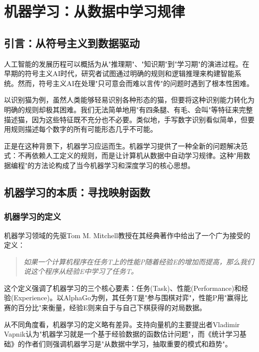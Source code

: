 \chapter{机器学习：从数据中学习规律}

\section{引言：从符号主义到数据驱动}

人工智能的发展历程可以概括为从"推理期"、"知识期"到"学习期"的演进过程。在早期的符号主义AI时代，研究者试图通过明确的规则和逻辑推理来构建智能系统。然而，符号主义AI在处理"只可意会而难以言传"的问题时遇到了根本性困难。

以识别猫为例，虽然人类能够轻易识别各种形态的猫，但要将这种识别能力转化为明确的规则却极其困难。我们无法简单地用"有四条腿、有毛、会叫"等特征来完整描述猫，因为这些特征既不充分也不必要。类似地，手写数字识别看似简单，但要用规则描述每个数字的所有可能形态几乎不可能。

正是在这种背景下，机器学习应运而生。机器学习提供了一种全新的问题解决范式：不再依赖人工定义的规则，而是让计算机从数据中自动学习规律。这种"用数据编程"的方法论构成了当今机器学习和深度学习的核心思想。

\section{机器学习的本质：寻找映射函数}

\subsection{机器学习的定义}

机器学习领域的先驱Tom M. Mitchell教授在其经典著作中给出了一个广为接受的定义：

\begin{quote}
\textit{如果一个计算机程序在任务T上的性能P随着经验E的增加而提高，那么我们说这个程序从经验E中学习了任务T。}
\end{quote}

这个定义强调了机器学习的三个核心要素：任务(Task)、性能(Performance)和经验(Experience)。以AlphaGo为例，其任务T是"参与围棋对弈"，性能P用"赢得比赛的百分比"来衡量，经验E则来自于与自己下棋获得的对局数据。

从不同角度看，机器学习的定义略有差异。支持向量机的主要提出者Vladimir Vapnik认为"机器学习就是一个基于经验数据的函数估计问题"，而《统计学习基础》的作者们则强调机器学习是"从数据中学习，抽取重要的模式和趋势"。

